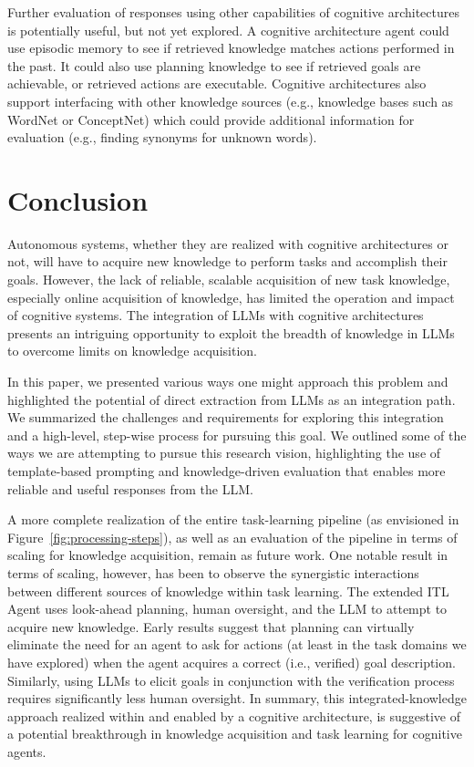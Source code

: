 \documentclass[letterpaper]{article} %
\begin{document}
Further evaluation of responses using other capabilities of cognitive architectures is potentially useful, but not yet explored. A cognitive architecture agent could use episodic memory to see if retrieved knowledge matches actions performed in the past. It could also use planning knowledge to see if retrieved goals are achievable, or retrieved actions are executable. Cognitive architectures also support interfacing with other knowledge sources (e.g., knowledge bases such as WordNet or ConceptNet) which could provide additional information for evaluation (e.g., finding synonyms for unknown words).


\section{Conclusion}

Autonomous systems, whether they are realized with cognitive architectures or not, will have to acquire new knowledge to perform tasks and accomplish their goals.
However, the lack of reliable, scalable acquisition of new task knowledge, especially online acquisition of knowledge, has limited the operation and impact of cognitive systems. The integration of LLMs with cognitive architectures presents an intriguing opportunity to exploit the breadth of knowledge in LLMs to overcome limits on knowledge acquisition.

In this paper, we presented various ways one might approach this problem and highlighted the potential of direct extraction from LLMs as an integration path. We summarized the challenges and requirements for exploring this integration and a high-level, step-wise process for pursuing this goal. We outlined some of the ways we are attempting to pursue this research vision, highlighting the use of template-based prompting and knowledge-driven evaluation that enables more reliable and useful responses from the LLM.

A more complete realization of the entire task-learning pipeline (as envisioned in Figure~\ref{fig:processing-steps}), as well as an evaluation of the pipeline in terms of scaling for knowledge acquisition, remain as future work. One notable result in terms of scaling, however, has been to observe the synergistic interactions between different sources of knowledge within task learning. The extended ITL Agent uses look-ahead planning, human oversight, and the LLM to attempt to acquire new knowledge. Early results \cite{kirk_integrating_2023} suggest that planning can virtually eliminate the need for an agent to ask for actions (at least in the task domains we have explored) when the agent acquires a correct (i.e., verified) goal description. Similarly, using LLMs to elicit goals in conjunction with the verification process requires significantly less human oversight. In summary, this integrated-knowledge approach realized within and enabled by a cognitive architecture, is suggestive of a potential breakthrough in knowledge acquisition and task learning for cognitive agents.
\end{document}
